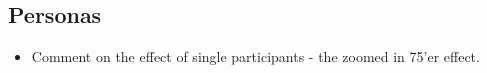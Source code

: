 \subsection{Personas}

\begin{itemize}
\item Comment on the effect of single participants - the zoomed in 75'er effect.
\end{itemize}
